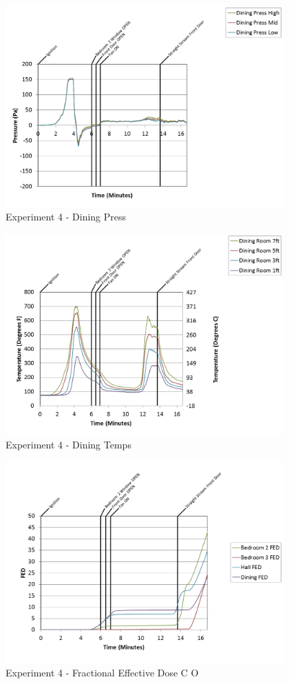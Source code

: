 \documentclass{article}
\begin{document}
\begin{appendices}
\clearpage

\begin{figure}[h!]
	\centering
	\includegraphics[height=3.05in]{0_Images/Results_Charts/Exp_4_Charts/DiningPress.png}
	\caption{Experiment 4 - Dining Press}
\end{figure}


\begin{figure}[h!]
	\centering
	\includegraphics[height=3.05in]{0_Images/Results_Charts/Exp_4_Charts/DiningTemps.png}
	\caption{Experiment 4 - Dining Temps}
\end{figure}

\clearpage

\begin{figure}[h!]
	\centering
	\includegraphics[height=3.05in]{0_Images/Results_Charts/Exp_4_Charts/FractionalEffectiveDoseCO.png}
	\caption{Experiment 4 - Fractional Effective Dose C O}
\end{figure}



\end{appendices}
\end{document}
